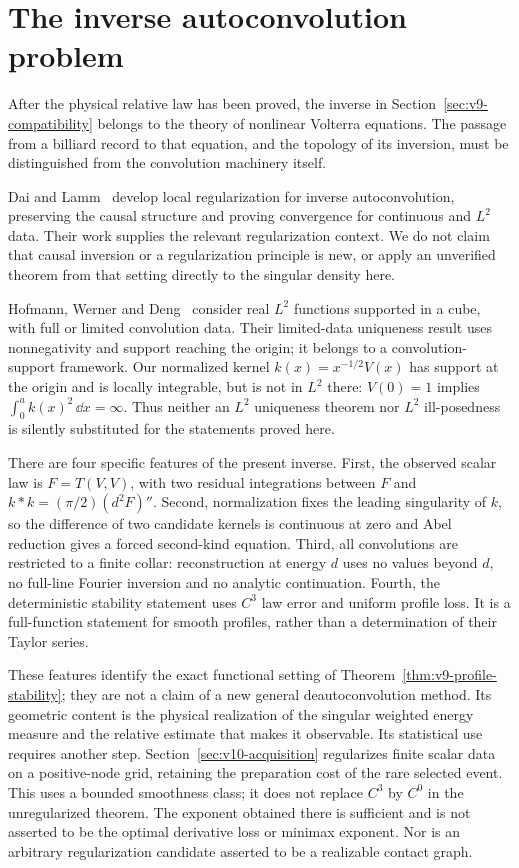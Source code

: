 \section{The inverse autoconvolution problem}
\label{sec:v10-deautoconvolution}
After the physical relative law has been proved, the inverse in
Section~\ref{sec:v9-compatibility} belongs to the theory of nonlinear
Volterra equations. The passage from a billiard record to that equation,
and the topology of its inversion, must be distinguished from the
convolution machinery itself.

Dai and Lamm~\cite{DaiLamm} develop local regularization for inverse
autoconvolution, preserving the causal structure and proving convergence
for continuous and $L^2$ data. Their work supplies the relevant
regularization context. We do not claim that causal inversion or a
regularization principle is new, or apply an unverified theorem from
that setting directly to the singular density here.

Hofmann, Werner and Deng~\cite{HofmannWernerDeng} consider real
$L^2$ functions supported in a cube, with full or limited convolution
data. Their limited-data uniqueness result uses nonnegativity and
support reaching the origin; it belongs to a convolution-support
framework. Our normalized kernel $k(x)=x^{-1/2}V(x)$ has support at
the origin and is locally integrable, but is not in $L^2$ there:
$V(0)=1$ implies $\int_0^a k(x)^2\,\dd x=\infty$.
Thus neither an $L^2$ uniqueness theorem nor $L^2$ ill-posedness is
silently substituted for the statements proved here.

There are four specific features of the present inverse. First, the
observed scalar law is $F=T(V,V)$, with two residual integrations
between $F$ and $k*k=(\pi/2)(d^2F)''$. Second, normalization fixes
the leading singularity of $k$, so the difference of two candidate
kernels is continuous at zero and Abel reduction gives a forced
second-kind equation. Third, all convolutions are restricted to a
finite collar: reconstruction at energy $d$ uses no values beyond
$d$, no full-line Fourier inversion and no analytic continuation.
Fourth, the deterministic stability statement uses $C^3$ law error
and uniform profile loss. It is a full-function statement for smooth
profiles, rather than a determination of their Taylor series.

These features identify the exact functional setting of
Theorem~\ref{thm:v9-profile-stability}; they are not a claim of a new
general deautoconvolution method. Its geometric content is the
physical realization of the singular weighted energy measure and the
relative estimate that makes it observable. Its statistical use
requires another step. Section~\ref{sec:v10-acquisition} regularizes
finite scalar data on a positive-node grid, retaining the preparation
cost of the rare selected event. This uses a bounded smoothness class;
it does not replace $C^3$ by $C^0$ in the unregularized theorem.
The exponent obtained there is sufficient and is not asserted to
be the optimal derivative loss or minimax exponent. Nor is an arbitrary
regularization candidate asserted to be a realizable contact graph.
